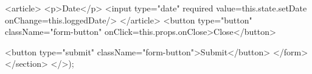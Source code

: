 {{            <article>
                <p>Date</p>
                <input type="date" required value={this.state.setDate} onChange={this.loggedDate}/>
            </article>
            <button type="button" className="form-button" onClick={this.props.onClose}>Close</button>
                
            <button type="submit" className="form-button">Submit</button>
        </form>
        </section>
    </>);
   }
}